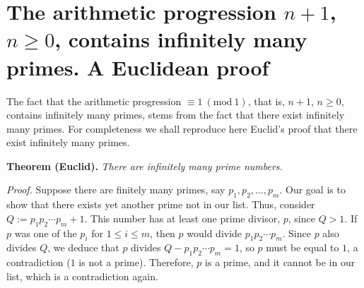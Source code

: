 \documentclass[a4paper, 12pt]{article}
\theoremstyle{definition}
\newcommand{\Mod}[1]{\ (\mathrm{mod}\ #1)} %
\renewcommand\title{\textbf{The arithmetic progression $n+1$, $n\geqslant0$, contains infinitely many primes.\\ A Euclidean proof}}
\begin{document}
	\thispagestyle{plain}
	\sloppy
	\section{The arithmetic progression $n+1$, $n\geqslant0$, contains infinitely many primes. A Euclidean proof}
	
	The fact that the arithmetic progression $\equiv 1 \Mod{1}$, that is, $n+1$, $n\geqslant0$, contains infinitely many primes, stems from the fact that there exist infinitely many primes. For completeness we shall reproduce here Euclid's proof that there exist infinitely many primes.
	
\textbf{Theorem (Euclid).} \emph{There are infinitely many prime numbers.}

	\textit{Proof.} Suppose there are finitely many primes, say $p_1,p_2,\dots,p_m$. Our goal is to show that there exists yet another prime not in our list. Thus, consider $Q:=p_1p_2\cdots p_m+1$. This number has at least one prime divisor, $p$, since $Q>1$. If $p$ was one of the $p_i$ for $1\leqslant i \leqslant m$, then $p$ would divide $p_1p_2\cdots p_m$. Since $p$ also divides $Q$, we deduce that $p$ divides $Q-p_1p_2\cdots p_m=1$, so $p$ must be equal to $1$, a contradiction ($1$ is not a prime). Therefore, $p$ is a prime, and it cannot be in our list, which is a contradiction again. 
\end{document}
